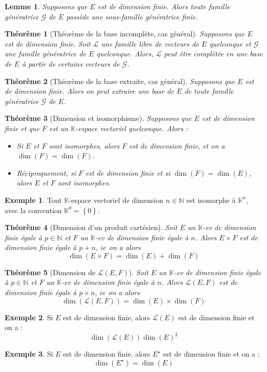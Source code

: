 \documentclass[french]{book}
\newcommand{\N}{\mathbb{N}}
\newcommand{\K}{\mathbb{K}}
\newcommand{\st}{^\star}
\theoremstyle{plain}
\newtheorem{thm}{Théorème}[chapter]
\newtheorem{lem}{Lemme}[chapter]
\theoremstyle{definition}
\newtheorem{exa}{Exemple}[chapter]
\theoremstyle{remark}
\begin{document}
\begin{lem}
	Supposons que $E$ est de dimension finie. Alors toute famille génératrice $\mathcal{G}$ de $E$ possède une sous-famille génératrice finie.
\end{lem}
\begin{thm}[Théorème de la base incomplète, cas général]
	Supposons que $E$ est de dimension finie. Soit $\mathcal{L}$ une famille libre de vecteurs de $E$ quelconque et $\mathcal{G}$ une famille génératrice de $E$ quelconque. Alors, $\mathcal{L}$ peut être complétée en une base de $E$ à partir de certains vecteurs de $\mathcal{G}$.
\end{thm}
\begin{thm}[Théorème de la base extraite, cas général]
	Supposons que $E$ est de dimension finie. Alors on peut extraire une base de $E$ de toute famille génératrice $\mathcal{G}$ de $E$.
\end{thm}
\begin{thm}[Dimension et isomorphisme]
	Supposons que $E$ est de dimension finie et que $F$ est un $\K$-espace vectoriel quelconque. Alors : \begin{itemize}
		\item Si $E$ et $F$ sont isomorphes, alors $F$ est de dimension finie, et on a $\dim(F)=\dim(F)$.
		\item Réciproquement, si $F$ est de dimension finie et si $\dim(F)=\dim(E)$, alors $E$ et $F$ sont isomorphes.
	\end{itemize}
\end{thm}
\begin{exa}
	Tout $\K$-espace vectoriel de dimension $n\in\N$ est isomorphe à $\K^n$, avec la convention $\K^0=\left\{0\right\}$.
\end{exa}
\begin{thm}[Dimension d'un produit cartésien]
	Soit $E$ un $\K$-ev de dimension finie égale à $p\in\N$ et $F$ un $\K$-ev de dimension finie égale à $n$. Alors $E\times F$ est de dimension finie égale à $p+n$, $ie$ on a alors $$\dim(E\times F)=\dim(E)+\dim(F)$$
\end{thm}
\begin{thm}[Dimension de $\mathcal{L}(E,F)$]
	Soit $E$ un $\K$-ev de dimension finie égale à $p\in\N$ et $F$ un $\K$-ev de dimension finie égale à $n$. Alors $\mathcal{L}(E,F)$ est de dimension finie égale à $p\times n$, $ie$ on a alors $$\dim(\mathcal{L}(E,F))=\dim(E)\times\dim(F)$$
\end{thm}
\begin{exa}
	Si $E$ est de dimension finie, alors $\mathcal{L}(E)$ est de dimension finie et on a : $$\dim(\mathcal{L}(E))\dim(E)^2$$
\end{exa}
\begin{exa}
	Si $E$ est de dimension finie, alors $E\st$ est de dimension finie et on a : $$\dim(E\st)=\dim(E)$$
\end{exa}
\end{document}
